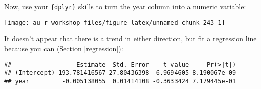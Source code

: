 \documentclass[]{book}
\newenvironment{Shaded}{\begin{snugshade}}{\end{snugshade}}
\newcommand{\KeywordTok}[1]{\textcolor[rgb]{0.13,0.29,0.53}{\textbf{#1}}}
\newcommand{\DataTypeTok}[1]{\textcolor[rgb]{0.13,0.29,0.53}{#1}}
\newcommand{\DecValTok}[1]{\textcolor[rgb]{0.00,0.00,0.81}{#1}}
\newcommand{\StringTok}[1]{\textcolor[rgb]{0.31,0.60,0.02}{#1}}
\newcommand{\CommentTok}[1]{\textcolor[rgb]{0.56,0.35,0.01}{\textit{#1}}}
\newcommand{\OperatorTok}[1]{\textcolor[rgb]{0.81,0.36,0.00}{\textbf{#1}}}
\newcommand{\NormalTok}[1]{#1}
\theoremstyle{definition}
\theoremstyle{definition}
\theoremstyle{definition}
\theoremstyle{remark}
\begin{document}
Now, use your \texttt{\{dplyr\}} skills to turn the year column into a
numeric variable:

\begin{Shaded}
\end{Shaded}

\begin{center}\texttt{[image: au-r-workshop\_files/figure-latex/unnamed-chunk-243-1]} \end{center}

It doesn't appear that there is a trend in either direction, but fit a
regression line because you can (Section \ref{regression}):

\begin{Shaded}
\end{Shaded}

\begin{verbatim}
##                  Estimate  Std. Error    t value     Pr(>|t|)
## (Intercept) 193.781416567 27.80436398  6.9694605 8.190067e-09
## year         -0.005138055  0.01414108 -0.3633424 7.179445e-01
\end{verbatim}
\end{document}
